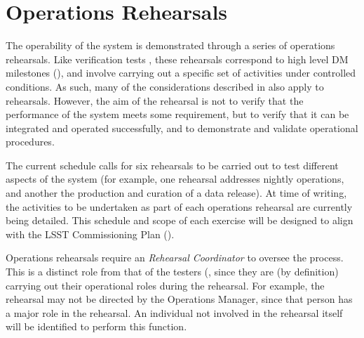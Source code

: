 \section{Operations Rehearsals}

The operability of the \product{} system is demonstrated through a series of operations rehearsals.
Like verification tests , these rehearsals correspond to high level DM milestones (), and involve carrying out a specific set of activities under controlled conditions.
As such, many of the considerations described in  also apply to rehearsals.
However, the aim of the rehearsal is not to verify that the performance of the \product{} system meets some requirement, but to verify that it can be integrated and operated successfully, and to demonstrate and validate operational procedures.

The current schedule calls for six rehearsals to be carried out to test different aspects of the system (for example, one rehearsal addresses nightly operations, and another the production and curation of a data release).
At time of writing, the activities to be undertaken as part of each operations rehearsal are currently being detailed.
This schedule and scope of each exercise will be designed to align with the LSST Commissioning Plan ().

Operations rehearsals require an \emph{Rehearsal Coordinator} to oversee the process.
This is a distinct role from that of the testers (, since they are (by definition) carrying out their operational roles during the rehearsal.
For example, the rehearsal may not be directed by the Operations Manager, since that person has a major role in the rehearsal.
An individual not involved in the rehearsal itself will be identified to perform this function.
